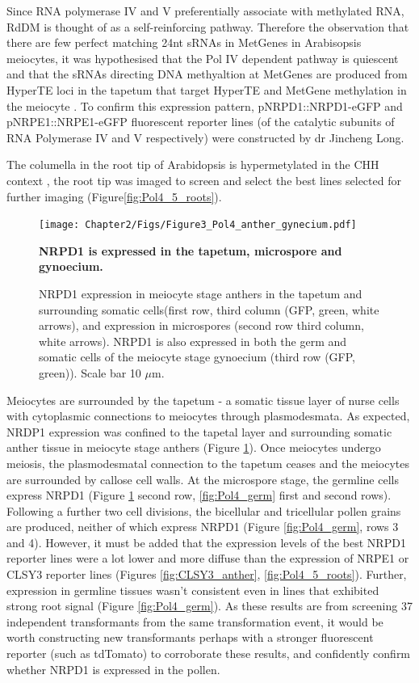 Since RNA polymerase IV and V preferentially associate with methylated RNA, RdDM is thought of as a self-reinforcing pathway. Therefore the observation that there are few perfect matching 24nt sRNAs in MetGenes in Arabisopsis meiocytes, it was hypothesised that the Pol IV dependent pathway is quiescent and that the sRNAs directing DNA methyaltion at MetGenes are produced from HyperTE loci in the tapetum that target HyperTE and MetGene methylation in the meiocyte \citep{RN199,RN187}. To confirm this expression pattern, pNRPD1::NRPD1-eGFP and pNRPE1::NRPE1-eGFP fluorescent reporter lines (of the catalytic subunits of RNA Polymerase IV and V respectively) were constructed by dr Jincheng Long.

The columella in the root tip of Arabidopsis is hypermetylated in the CHH context \citep{RN261}, the root tip was imaged to screen and select the best lines selected for further imaging (Figure\ref{fig:Pol4_5_roots}).

\begin{figure}[htbp!] 
\centering    
    \texttt{[image: Chapter2/Figs/Figure3\_Pol4\_anther\_gynecium.pdf]}
\caption{\textbf{NRPD1 is expressed in the tapetum, microspore and gynoecium.}}
\label{fig:Pol4_anther}
\captionsetup{font=small}
    \caption*{NRPD1 expression in meiocyte stage anthers in the tapetum and surrounding somatic cells(first row, third column (GFP, green, white arrows), and expression in microspores (second row third column, white arrows). NRPD1 is also expressed in both the germ and somatic cells of the meiocyte stage gynoecium (third row (GFP, green)). Scale bar 10 $\mu$m.}
\end{figure}

Meiocytes are surrounded by the tapetum - a somatic tissue layer of nurse cells with cytoplasmic connections to meiocytes through plasmodesmata. As expected, NRDP1 expression was confined to the tapetal layer and surrounding somatic anther tissue in meiocyte stage anthers (Figure \ref{fig:Pol4_anther}). Once meiocytes undergo meiosis, the plasmodesmatal connection to the tapetum ceases and the meiocytes are surrounded by callose cell walls. At the microspore stage, the germline cells express NRPD1 (Figure \ref{fig:Pol4_anther} second row, \ref{fig:Pol4_germ} first and second rows). Following a further two cell divisions, the bicellular and tricellular pollen grains are produced, neither of which express NRPD1 (Figure \ref{fig:Pol4_germ}, rows 3 and 4). However, it must be added that the expression levels of the best NRPD1 reporter lines were a lot lower and more diffuse than the expression of NRPE1 or CLSY3 reporter lines (Figures \ref{fig:CLSY3_anther}, \ref{fig:Pol4_5_roots}). Further, expression in germline tissues wasn't consistent even in lines that exhibited strong root signal (Figure \ref{fig:Pol4_germ}). As these results are from screening 37 independent transformants from the same transformation event, it would be worth constructing new transformants perhaps with a stronger fluorescent reporter (such as tdTomato) to corroborate these results, and confidently confirm whether NRPD1 is expressed in the pollen.

